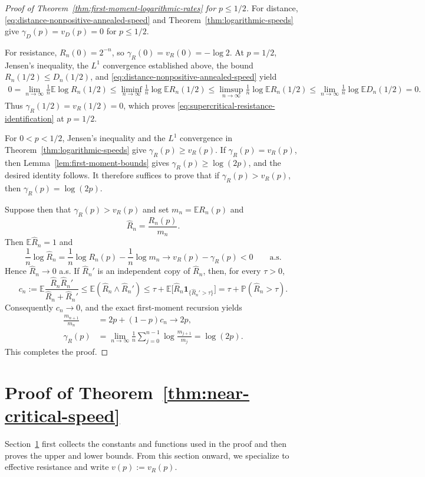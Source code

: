 \documentclass[a4paper,fleqn]{cas-sc}
\numberwithin{equation}{section}
\theoremstyle{plain}
\theoremstyle{definition}
\newcommand{\E}{\mathbb E}
\newcommand{\Pp}{\mathbb P}
\newcommand{\ind}{\mathbf 1}
\begin{document}
\begin{proof}[Proof of Theorem~\ref{thm:first-moment-logarithmic-rates}
for $p\le 1/2$]
For distance, \eqref{eq:distance-nonpositive-annealed-speed} and
Theorem~\ref{thm:logarithmic-speeds} give
$\gamma_D(p)=v_D(p)=0$ for $p\le1/2$.

For resistance, $R_n(0)=2^{-n}$, so
$\gamma_R(0)=v_R(0)=-\log2$.  At $p=1/2$,
Jensen's inequality, the $L^1$ convergence established above,
the bound $R_n(1/2)\le D_n(1/2)$, and
\eqref{eq:distance-nonpositive-annealed-speed} yield
\[
\begin{aligned}
 0
 =\lim_{n\to\infty}\frac1n\E\log R_n(1/2)
 \le\liminf_{n\to\infty}\frac1n\log\E R_n(1/2)
 \le\limsup_{n\to\infty}\frac1n\log\E R_n(1/2)
 \le\lim_{n\to\infty}\frac1n\log\E D_n(1/2)=0.
\end{aligned}
\]
Thus $\gamma_R(1/2)=v_R(1/2)=0$, which proves
\eqref{eq:supercritical-resistance-identification} at $p=1/2$.

For $0<p<1/2$, Jensen's inequality and the $L^1$ convergence in
Theorem~\ref{thm:logarithmic-speeds} give $\gamma_R(p)\ge v_R(p)$.
If $\gamma_R(p)=v_R(p)$, then Lemma~\ref{lem:first-moment-bounds} gives
$\gamma_R(p)\ge\log(2p)$, and the desired identity follows.  It therefore
suffices to prove that if $\gamma_R(p)>v_R(p)$, then
$\gamma_R(p)=\log(2p)$.

Suppose then that $\gamma_R(p)>v_R(p)$ and set
$m_n=\E R_n(p)$ and
\[
 \widehat R_n=\frac{R_n(p)}{m_n}.
\]
Then $\E\widehat R_n=1$ and
\[
 \frac1n\log\widehat R_n
 =\frac1n\log R_n(p)-\frac1n\log m_n
 \longrightarrow v_R(p)-\gamma_R(p)<0
 \qquad\text{a.s.}
\]
Hence $\widehat R_n\to0$ a.s.  If $\widehat R_n'$ is an independent copy of
$\widehat R_n$, then, for every $\tau>0$,
\[
 c_n:=\E\frac{\widehat R_n\widehat R_n'}
                    {\widehat R_n+\widehat R_n'}
 \le \E(\widehat R_n\wedge\widehat R_n')
 \le \tau+\E\bigl[\widehat R_n
                   \ind_{\{\widehat R_n'>\tau\}}\bigr]
 =\tau+\Pp(\widehat R_n>\tau).
\]
Consequently $c_n\to0$, and the exact first-moment recursion yields
\[
\begin{aligned}
 \frac{m_{n+1}}{m_n}
 &=2p+(1-p)c_n\longrightarrow2p,\\
 \gamma_R(p)
 &=\lim_{n\to\infty}\frac1n
   \sum_{j=0}^{n-1}\log\frac{m_{j+1}}{m_j}
 =\log(2p).
\end{aligned}
\]
This completes the proof.
\end{proof}

\section{Proof of Theorem~\ref{thm:near-critical-speed}}
\label{sec:two-sided-barriers}
Section~\ref{sec:two-sided-barriers} first collects the constants and
functions used in the proof and then proves the upper and lower bounds.
From this section onward, we specialize to effective resistance and write
$v(p):=v_R(p)$.
\end{document}
